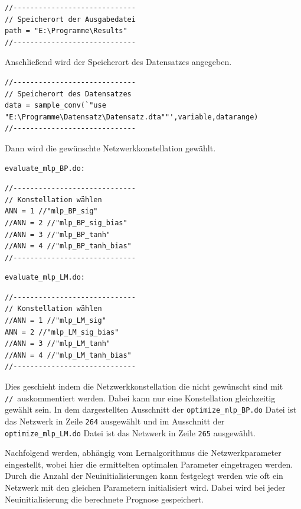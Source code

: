 {
\begin{lstlisting}[firstnumber=273]
//-----------------------------
// Speicherort der Ausgabedatei
path = "E:\Programme\Results"
//-----------------------------
\end{lstlisting}
}

Anschließend wird der Speicherort des Datensatzes angegeben.

{
\begin{lstlisting}[firstnumber=305]
//-----------------------------
// Speicherort des Datensatzes
data = sample_conv(`"use "E:\Programme\Datensatz\Datensatz.dta""',variable,datarange)
//-----------------------------
\end{lstlisting}
}

Dann wird die gewünschte Netzwerkkonstellation gewählt.
\begin{Verbatim}
evaluate_mlp_BP.do:
\end{Verbatim}
{
\begin{lstlisting}[firstnumber=262]
//-----------------------------
// Konstellation wählen
ANN = 1 //"mlp_BP_sig"
//ANN = 2 //"mlp_BP_sig_bias"
//ANN = 3 //"mlp_BP_tanh"
//ANN = 4 //"mlp_BP_tanh_bias"
//-----------------------------
\end{lstlisting}
}


\begin{Verbatim}
evaluate_mlp_LM.do:
\end{Verbatim}
{
\begin{lstlisting}[firstnumber=262]
//-----------------------------
// Konstellation wählen
//ANN = 1 //"mlp_LM_sig"
ANN = 2 //"mlp_LM_sig_bias"
//ANN = 3 //"mlp_LM_tanh"
//ANN = 4 //"mlp_LM_tanh_bias"
//-----------------------------
\end{lstlisting}
}

Dies geschieht indem die Netzwerkkonstellation die nicht gewünscht sind mit \glqq \verb|//|\grqq~auskommentiert werden. Dabei kann nur eine Konstellation gleichzeitig gewählt sein. In dem dargestellten Ausschnitt der \verb|optimize_mlp_BP.do| Datei ist das Netzwerk in Zeile \verb|264| ausgewählt und im Ausschnitt der \verb|optimize_mlp_LM.do| Datei ist das Netzwerk in Zeile \verb|265| ausgewählt.

Nachfolgend werden, abhängig vom Lernalgorithmus die Netzwerkparameter eingestellt, wobei hier die ermittelten optimalen Parameter eingetragen werden. Durch die Anzahl der Neuinitialisierungen kann festgelegt werden wie oft ein Netzwerk mit den gleichen Parametern initialisiert wird. Dabei wird bei jeder Neuinitialisierung die berechnete Prognose gespeichert.

